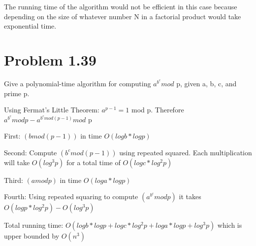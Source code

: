 \documentclass{article}
\begin{document}
The running time of the algorithm would not be efficient in this case because depending on the size of whatever number N in a factorial product would take exponential time.

\section{Problem 1.39}
Give a polynomial-time algorithm for computing $a^{b^{c}}
mod$ p, given a, b, c, and prime p.
\vspace{2mm}

Using Fermat's Little Theorem: $a^{p-1} = 1$ mod p. Therefore $a^{b^{c}} mod p - a^{b^{c} mod (p-1)} mod$ p

First: $(b mod (p-1))$ in time $O(logb*logp)$

Second: Compute $(b^{c} mod (p-1))$ using repeated squared. Each multiplication will take $O(log^{3}p)$ for a total time of $O(logc*log^{2}p)$

Third: $(a mod p)$ in time $O(loga*logp)$

Fourth: Using repeated squaring to compute $(a^{b^{c}} mod p)$ it takes $O(logp*log^{2}p) - O(log^{3}p)$
\vspace{2mm}

Total running time: $O(logb * logp + logc * log^{2}p + loga * logp + log^{3}p)$ which is upper bounded by $O(n^{3})$
\end{document}
